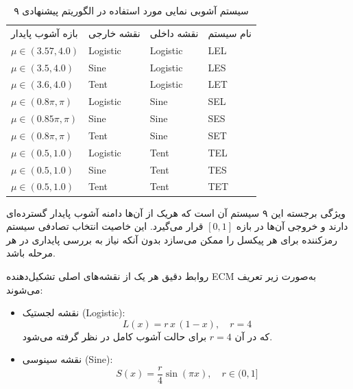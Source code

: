 \begin{table}[h]
\centering
\small
\begin{tabular}{llll}
\hline
بازه آشوب پایدار & نقشه خارجی & نقشه داخلی & نام سیستم \\
$\mu \in (3.57, 4.0)$ & ‎Logistic‎ & ‎Logistic‎ & ‎LEL‎ \\
$\mu \in (3.5, 4.0)$ & ‎Sine‎ & ‎Logistic‎ & ‎LES‎ \\
$\mu \in (3.6, 4.0)$ & ‎Tent‎ & ‎Logistic‎ & ‎LET‎ \\
$\mu \in (0.8\pi, \pi)$ & ‎Logistic‎ & ‎Sine‎ & ‎SEL‎ \\
$\mu \in (0.85\pi, \pi)$ & ‎Sine‎ & ‎Sine‎ & ‎SES‎ \\
$\mu \in (0.8\pi, \pi)$ & ‎Tent‎ & ‎Sine‎ & ‎SET‎ \\
$\mu \in (0.5, 1.0)$ & ‎Logistic‎ & ‎Tent‎ & ‎TEL‎ \\
$\mu \in (0.5, 1.0)$ & ‎Sine‎ & ‎Tent‎ & ‎TES‎ \\
$\mu \in (0.5, 1.0)$ & ‎Tent‎ & ‎Tent‎ & ‎TET‎ \\
\hline
\end{tabular}
\caption{۹ سیستم آشوبی نمایی مورد استفاده در الگوریتم پیشنهادی}
\end{table}

ویژگی برجسته این ۹ سیستم آن است که هریک از آن‌ها دامنه آشوب پایدار گسترده‌ای دارند و خروجی آن‌ها در بازه $[0,1]$ قرار می‌گیرد\cite{ref4, ref1}. این خاصیت انتخاب تصادفی سیستم رمزکننده برای هر پیکسل را ممکن می‌سازد بدون آنکه نیاز به بررسی پایداری در هر مرحله باشد.

روابط دقیق هر یک از نقشه‌های اصلی تشکیل‌دهنده ‎ECM‎ به‌صورت زیر تعریف می‌شوند:

\begin{itemize}
    \item نقشه لجستیک (‎Logistic‎):
    \begin{equation}
    L(x) = r\,x\,(1-x), \quad r=4
    \label{eq:ch3-logistic}
    \end{equation}
    که در آن $r=4$ برای حالت آشوب کامل در نظر گرفته می‌شود.
\end{itemize}

\begin{itemize}
    \item نقشه سینوسی (‎Sine‎):
    \begin{equation}
    S(x) = \frac{r}{4}\sin(\pi x), \quad r \in (0,1]
    \label{eq:ch3-sine}
    \end{equation}
\end{itemize}

